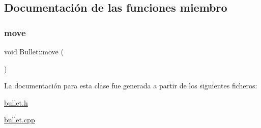 \subsection{Documentación de las funciones miembro}
\hypertarget{class_bullet_a6140db968c42c05e829e142f74f20b16}{}\label{class_bullet_a6140db968c42c05e829e142f74f20b16} 
\subsubsection{\texorpdfstring{move}{move}}
{\footnotesize\ttfamily void Bullet\+::move (\begin{DoxyParamCaption}{ }\end{DoxyParamCaption})\hspace{0.3cm}{\ttfamily [slot]}}



La documentación para esta clase fue generada a partir de los siguientes ficheros\+:\begin{DoxyCompactItemize}
\item 
\hyperlink{bullet_8h}{bullet.\+h}\item 
\hyperlink{bullet_8cpp}{bullet.\+cpp}\end{DoxyCompactItemize}
